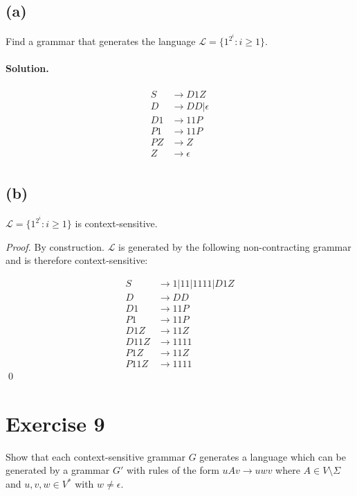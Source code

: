\documentclass[11pt]{llncs}
\begin{document}
\subsection*{(a)}
Find a grammar that generates the language
$\mathcal{L} = \{1^{2^i}: i \geq 1\}$.

\paragraph{Solution.}

\begin{align*}
  S  &\rightarrow D1Z\\
  D  &\rightarrow DD | \epsilon\\
  D1 &\rightarrow 11P\\
  P1 &\rightarrow 11P\\
  PZ &\rightarrow Z\\
  Z  &\rightarrow \epsilon\\
\end{align*}

\subsection*{(b)}
\begin{lemma}
$\mathcal{L} = \{1^{2^i}: i \geq 1\}$ is context-sensitive.
\end{lemma}
\begin{proof}
By construction. $\mathcal{L}$ is generated by the following
non-contracting grammar and is therefore context-sensitive:

\begin{align*}
  S    &\rightarrow 1 | 11 | 1111 | D1Z\\
  D    &\rightarrow DD\\
  D1   &\rightarrow 11P\\
  P1   &\rightarrow 11P\\
  D1Z  &\rightarrow 11Z\\
  D11Z &\rightarrow 1111\\
  P1Z  &\rightarrow 11Z\\
  P11Z &\rightarrow 1111
\end{align*}
\qed
\end{proof}

\section*{Exercise 9}
Show that each context-sensitive grammar $G$ generates a language which can be
generated by a grammar $G'$ with rules of the form $uAv \rightarrow uwv$ where
$A \in V \setminus \Sigma$ and $u, v, w \in V^*$ with $w \neq \epsilon$.
\end{document}
